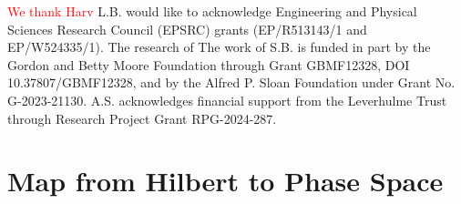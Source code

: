 \documentclass[%
reprint,
superscriptaddress,
nofootinbib,
 amsmath,amssymb,
prx,
floatfix,
]{revtex4-2}
\begin{document}
\textcolor{red}{We thank Harv }L.B. would like to acknowledge Engineering and Physical Sciences Research Council (EPSRC) grants (EP/R513143/1 and EP/W524335/1). The research of
The work of S.B. is funded in part by the Gordon and Betty Moore Foundation through
Grant GBMF12328, DOI 10.37807/GBMF12328, and by the Alfred P. Sloan Foundation under Grant
No. G-2023-21130. A.S. acknowledges financial support from the Leverhulme Trust through
Research Project Grant RPG-2024-287.
 

\appendix

\onecolumngrid

\section{Map from Hilbert to Phase Space \label{app:map_phase_space}}
\end{document}
